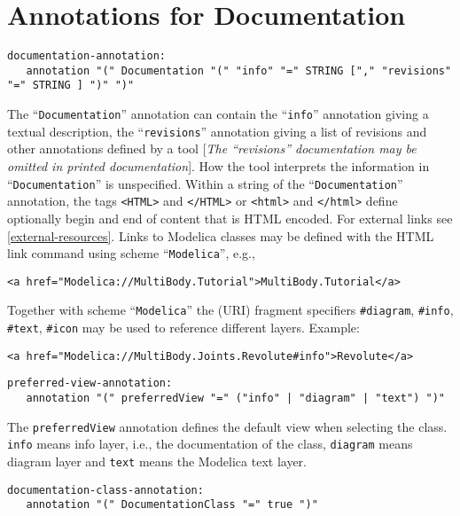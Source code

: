 \section{Annotations for Documentation}

\begin{lstlisting}[language=grammar]
documentation-annotation:
   annotation "(" Documentation "(" "info" "=" STRING ["," "revisions" "=" STRING ] ")" ")"
\end{lstlisting}
The ``\lstinline!Documentation!'' annotation can contain the ``\lstinline!info!'' annotation
giving a textual description, the ``\lstinline!revisions!'' annotation giving a list
of revisions and other annotations defined by a tool {[}\emph{The
``revisions'' documentation may be omitted in printed documentation}{]}.
How the tool interprets the information in ``\lstinline!Documentation!'' is
unspecified. Within a string of the ``\lstinline!Documentation!'' annotation, the
tags \lstinline!<HTML>! and \lstinline!</HTML>! or
\lstinline!<html>! and \lstinline!</html>! define
optionally begin and end of content that is HTML encoded. For external
links see \autoref{external-resources}. Links to Modelica classes may be defined with
the HTML link command using scheme ``\lstinline!Modelica!'', e.g.,

\begin{lstlisting}[language=modelica]
<a href="Modelica://MultiBody.Tutorial">MultiBody.Tutorial</a>
\end{lstlisting}

Together with scheme ``\lstinline!Modelica!'' the (URI) fragment specifiers
\lstinline!#diagram!, \lstinline!#info!, \lstinline!#text!, \lstinline!#icon! may be used to reference different
layers. Example:

\begin{lstlisting}[language=modelica]
<a href="Modelica://MultiBody.Joints.Revolute#info">Revolute</a>
\end{lstlisting}
\begin{lstlisting}[language=grammar]
preferred-view-annotation:
   annotation "(" preferredView "=" ("info" | "diagram" | "text") ")"
\end{lstlisting}

The \lstinline!preferredView! annotation defines the default view when selecting the
class. \lstinline!info! means info layer, i.e., the documentation of the class,
\lstinline!diagram! means diagram layer and \lstinline!text! means the Modelica text layer.
\begin{lstlisting}[language=grammar]
documentation-class-annotation:
   annotation "(" DocumentationClass "=" true ")"
\end{lstlisting}

